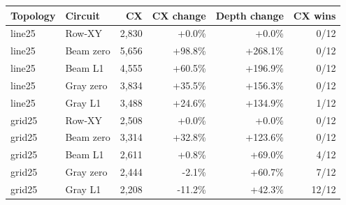 \begin{tabular}{llrrrr}
\toprule
Topology & Circuit & CX & CX change & Depth change & CX wins\\
\midrule
line25 & Row-XY & 2,830 & +0.0\% & +0.0\% & 0/12\\
line25 & Beam zero & 5,656 & +98.8\% & +268.1\% & 0/12\\
line25 & Beam L1 & 4,555 & +60.5\% & +196.9\% & 0/12\\
line25 & Gray zero & 3,834 & +35.5\% & +156.3\% & 0/12\\
line25 & Gray L1 & 3,488 & +24.6\% & +134.9\% & 1/12\\
grid25 & Row-XY & 2,508 & +0.0\% & +0.0\% & 0/12\\
grid25 & Beam zero & 3,314 & +32.8\% & +123.6\% & 0/12\\
grid25 & Beam L1 & 2,611 & +0.8\% & +69.0\% & 4/12\\
grid25 & Gray zero & 2,444 & -2.1\% & +60.7\% & 7/12\\
grid25 & Gray L1 & 2,208 & -11.2\% & +42.3\% & 12/12\\
\bottomrule
\end{tabular}
